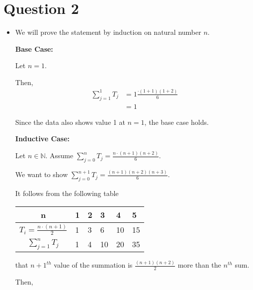 \documentclass[12pt]{article}
\begin{document}
\section*{Question 2}

\begin{itemize}
    \item

    We will prove the statement by induction on natural number $n$.

    \bigskip

    \textbf{Base Case:}

    \bigskip

    Let $n = 1$.

    \bigskip

    Then,
    \setcounter{equation}{0}
    \begin{align}
        \sum\limits_{j=1}^{1} T_j &= 1 \frac{\cdot (1+1)(1+2)}{6}\\
        &= 1
    \end{align}

    \bigskip

    Since the data also shows value 1 at $n = 1$, the base case holds.

    \bigskip

    \textbf{Inductive Case:}

    \bigskip

    Let $n \in \mathbb{N}$. Assume $\sum\limits_{j=0}^n T_j = \frac{n \cdot (n+1)(n+2)}{6}$.

    \bigskip

    We want to show $\sum\limits_{j=0}^{n+1} T_j = \frac{(n+1)(n+2)(n+3)}{6}$.

    \bigskip

    It follows from the following table

    \begin{tabularx}{\textwidth}{|c|X|X|X|X|X|}
        \hline
        n & 1 & 2 & 3 & 4 & 5\\
        \hline
        $T_i = \frac{n \cdot (n+1)}{2}$ & 1 & 3 & 6 & 10 & 15\\
        \hline
        $\sum\limits_{j=1}^n T_j$ & 1 & 4 & 10 & 20 & 35\\
        \hline
    \end{tabularx}

    that $n+1^{th}$ value of the summation is $\frac{(n+1)(n+2)}{2}$ more than
    the $n^{th}$ sum.

    \bigskip

    Then,


\end{itemize}
\end{document}
